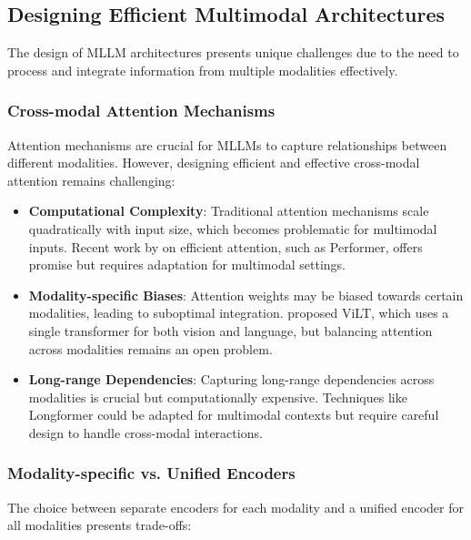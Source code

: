 \subsection{Designing Efficient Multimodal Architectures}
The design of MLLM architectures presents unique challenges due to the need to process and integrate information from multiple modalities effectively.

\subsubsection{Cross-modal Attention Mechanisms}
Attention mechanisms are crucial for MLLMs to capture relationships between different modalities. However, designing efficient and effective cross-modal attention remains challenging:

\begin{itemize}
    \item \textbf{Computational Complexity}: Traditional attention mechanisms scale quadratically with input size, which becomes problematic for multimodal inputs. Recent work by \citet{choromanski2021rethinking} on efficient attention, such as Performer, offers promise but requires adaptation for multimodal settings.
    
    \item \textbf{Modality-specific Biases}: Attention weights may be biased towards certain modalities, leading to suboptimal integration. \citet{kim2021vilt} proposed ViLT, which uses a single transformer for both vision and language, but balancing attention across modalities remains an open problem.
    
    \item \textbf{Long-range Dependencies}: Capturing long-range dependencies across modalities is crucial but computationally expensive. Techniques like Longformer \citep{beltagy2020longformer} could be adapted for multimodal contexts but require careful design to handle cross-modal interactions.
\end{itemize}

\subsubsection{Modality-specific vs. Unified Encoders}
The choice between separate encoders for each modality and a unified encoder for all modalities presents trade-offs:

